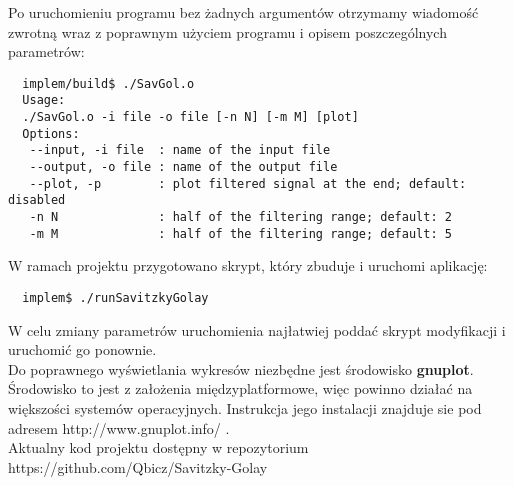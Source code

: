 \noindent Po uruchomieniu programu bez żadnych argumentów otrzymamy wiadomość zwrotną wraz z poprawnym użyciem programu i opisem poszczególnych parametrów:
\begin{verbatim}
  implem/build$ ./SavGol.o
  Usage:
  ./SavGol.o -i file -o file [-n N] [-m M] [plot]
  Options:
   --input, -i file  : name of the input file
   --output, -o file : name of the output file
   --plot, -p        : plot filtered signal at the end; default: disabled
   -n N              : half of the filtering range; default: 2
   -m M              : half of the filtering range; default: 5
\end{verbatim}



\noindent W ramach projektu przygotowano skrypt, który zbuduje i uruchomi aplikację:
\begin{verbatim}
  implem$ ./runSavitzkyGolay
\end{verbatim}

W celu zmiany parametrów uruchomienia najłatwiej poddać skrypt modyfikacji i uruchomić go ponownie.\\

Do poprawnego wyświetlania wykresów niezbędne jest środowisko \textbf{gnuplot}. Środowisko to jest z założenia międzyplatformowe, więc powinno działać na większości systemów operacyjnych. Instrukcja jego instalacji znajduje sie pod adresem http://www.gnuplot.info/ .\\




Aktualny kod projektu dostępny w repozytorium https://github.com/Qbicz/Savitzky-Golay
